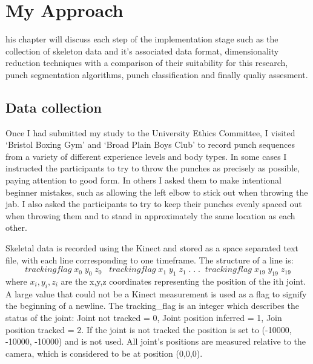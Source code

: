 %
%
\let\textcircled=\pgftextcircled
\chapter{My Approach}
\label{chap:intro}

his chapter will discuss each step of the implementation stage such as the collection of skeleton data and it's associated data format, dimensionality reduction techniques with a comparison of their suitability for this research, punch segmentation algorithms, punch classification and finally qualiy assesment.

\section{Data collection}
Once I had submitted my study to the University Ethics Committee, I visited `Bristol Boxing Gym' and `Broad Plain Boys Club' to record punch sequences from a variety of different experience levels and body types. In some cases I instructed the participants to try to throw the punches as precisely as possible, paying attention to good form. In others I asked them to make intentional beginner mistakes, such as allowing the left elbow to stick out when throwing the jab. I also asked the participants to try to keep their punches evenly spaced out when throwing them and to stand in approximately the same location as each other.

Skeletal data is recorded using the Kinect and stored as a space separated text file, with each line corresponding to one timeframe. The structure of a line is: 
$$trackingflag\;x_0\;y_0\;z_0\;\;\;trackingflag\;x_1\;y_1\;z_1\;.\;.\;.\;\;trackingflag\;x_{19}\;y_{19}\;z_{19}$$
where $x_i,y_i,z_i$ are the x,y,z coordinates representing the position of the ith joint.
A large value that could not be a Kinect measurement is used as a flag to signify the beginning of a newline. The tracking_flag is an integer which describes the status of the joint:\newline
Joint not tracked = 0, Joint position inferred = 1, Join position tracked = 2.\newline
If the joint is not tracked the position is set to (-10000, -10000, -10000) and is not used. All joint's positions are measured relative to the camera, which is considered to be at position (0,0,0).

